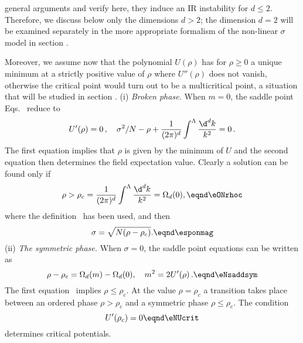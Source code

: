 general arguments and verify here, they induce an IR instability for $d\le 2$.
Therefore, we discuss below only the dimensions $d>2$; the dimension
$d=2$ will be examined separately in the more appropriate formalism
of the non-linear $\sigma $ model in section \label{\ssLTsN}.\par
Moreover, we assume now that the polynomial $U(\rho )$ has for $\rho \ge 0$
a unique minimum at a strictly positive value of $\rho $ where
$U''(\rho)$ does not vanish,
otherwise the critical point would turn out to be a multicritical
point,  a situation that  will be studied in section  \label{\ssdblescal}.
 \smallskip
(i) {\it Broken phase.}
When $m=0$, the saddle point Eqs.~\esaddleN{} reduce to
$$U'(\rho)=0 \,,\quad \sigma ^2/N-\rho+{1 \over  (2\pi)^{d}} \int^\Lambda { \d^{d}k \over
k^2} =0\,.$$
The first equation implies that $\rho $ is given by the minimum of $U$ and the second equation then determines the
field expectation value. Clearly a solution can be found only if
$$\rho> \rho_c={1 \over  (2\pi)^{d}} \int^\Lambda { \d^{d}k \over k^2}
=\Omega_d(0),\eqnd\eONrhoc  $$
where the definition \etadepole~has been used, and then
$$\sigma =\sqrt{N(\rho-\rho_c)}. \eqnd\esponmag $$
  \smallskip
(ii) {\it The symmetric phase.} When $\sigma =0$, the saddle point equations \esaddleN{} can be written as
$$ \rho- \rho_c=  \Omega_d(m)-\Omega_d(0) ,\quad m^2=2 U'(\rho)\,. \eqnd\eNsaddsym $$
The first equation \eNsaddsym\ implies $\rho \le \rho _c$. At the value $\rho =\rho _c$ a  transition
takes place between an ordered phase $\rho >\rho _c$ and a symmetric phase
$\rho \le \rho _c$. The condition
$$U'(\rho _c)=0 \eqnd\eNUcrit $$
determines critical potentials. \par

